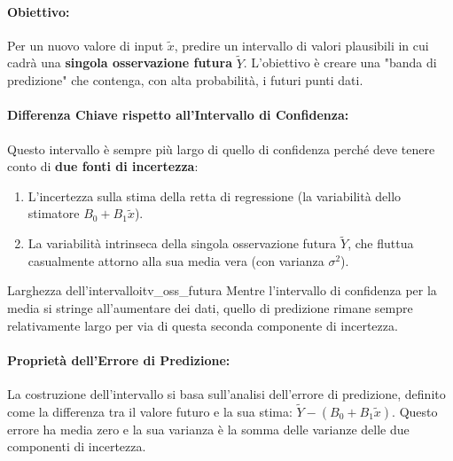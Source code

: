\paragraph{Obiettivo:} Per un nuovo valore di input \(\tilde{x}\), predire un intervallo di valori plausibili in cui cadrà una \textbf{singola osservazione futura} \(\tilde{Y}\). L'obiettivo è creare una "banda di predizione" che contenga, con alta probabilità, i futuri punti dati.

\paragraph{Differenza Chiave rispetto all'Intervallo di Confidenza:}
Questo intervallo è sempre più largo di quello di confidenza perché deve tenere conto di \textbf{due fonti di incertezza}:
\begin{enumerate}
    \item L'incertezza sulla stima della retta di regressione (la variabilità dello stimatore \(B_0 + B_1\tilde{x}\)).
    \item La variabilità intrinseca della singola osservazione futura \(\tilde{Y}\), che fluttua casualmente attorno alla sua media vera (con varianza \(\sigma^2\)).
\end{enumerate}

\begin{nota}{Larghezza dell'intervallo}{itv_oss_futura}
Mentre l'intervallo di confidenza per la media si stringe all'aumentare dei dati, quello di predizione rimane sempre relativamente largo per via di questa seconda componente di incertezza.
\end{nota}

\paragraph{Proprietà dell'Errore di Predizione:} La costruzione dell'intervallo si basa sull'analisi dell'errore di predizione, definito come la differenza tra il valore futuro e la sua stima: \( \tilde{Y} - (B_0 + B_1\tilde{x}) \). Questo errore ha media zero e la sua varianza è la somma delle varianze delle due componenti di incertezza.

